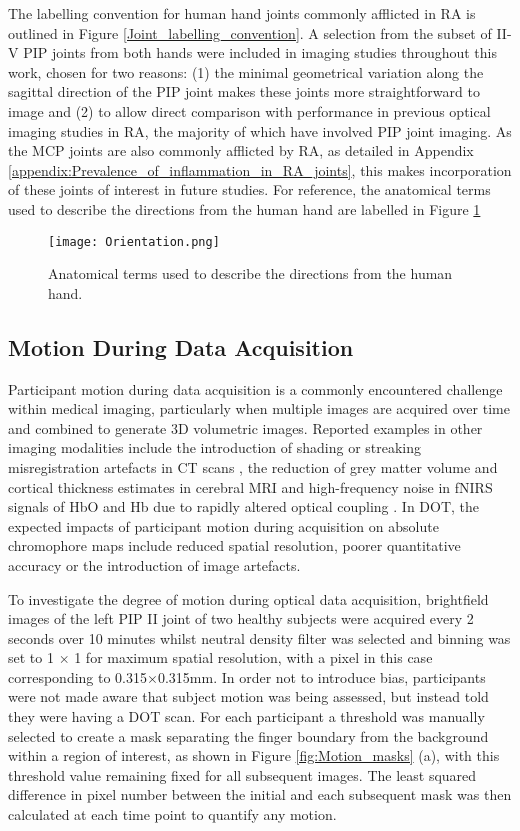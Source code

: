 \documentclass[twoside]{bhamthesis}
\theoremstyle{definition}
\begin{document}
The labelling convention for human hand joints commonly afflicted in RA is outlined in Figure \ref{Joint_labelling_convention}. A selection from the subset of II-V PIP joints from both hands were included in imaging studies throughout this work, chosen for two reasons: (1) the minimal geometrical variation along the sagittal direction of the PIP joint makes these joints more straightforward to image and (2) to allow direct comparison with performance in previous optical imaging studies in RA, the majority of which have involved PIP joint imaging. As the MCP joints are also commonly afflicted by RA, as detailed in Appendix \ref{appendix:Prevalence_of_inflammation_in_RA_joints}, this makes incorporation of these joints of interest in future studies. For reference, the anatomical terms used to describe the directions from the human hand are labelled in Figure \ref{Orientation}

\begin{figure}[!ht]
\centering\texttt{[image: Orientation.png]}
\caption{Anatomical terms used to describe the directions from the human hand.}
\label{Orientation}
\end{figure}

\subsection{Motion During Data Acquisition}
\label{Section:motion}

Participant motion during data acquisition is a commonly encountered challenge within medical imaging, particularly when multiple images are acquired over time and combined to generate 3D volumetric images. Reported examples in other imaging modalities include the introduction of shading or streaking misregistration artefacts in CT scans \cite{barrett2004artifacts}, the reduction of grey matter volume and cortical thickness estimates in cerebral MRI \cite{reuter2015head} and high-frequency noise in fNIRS signals of  HbO and Hb due to rapidly altered optical coupling \cite{cooper2012systematic}. In DOT, the expected impacts of participant motion during acquisition on absolute chromophore maps include reduced spatial resolution, poorer quantitative accuracy or the introduction of image artefacts. 

To investigate the degree of motion during optical data acquisition, brightfield images of the left PIP II joint of two healthy subjects were acquired every 2 seconds over 10 minutes whilst neutral density filter was selected and binning was set to 1 $\times$ 1 for maximum spatial resolution, with a pixel in this case corresponding to 0.315$\times$0.315mm. In order not to introduce bias, participants were not made aware that subject motion was being assessed, but instead told they were having a DOT scan. For each participant a threshold was manually selected to create a mask separating the finger boundary from the background within a region of interest, as shown in Figure \ref{fig:Motion_masks} (a), with this threshold value remaining fixed for all subsequent images. The least squared difference in pixel number between the initial and each subsequent mask was then calculated at each time point to quantify any motion.
\end{document}

